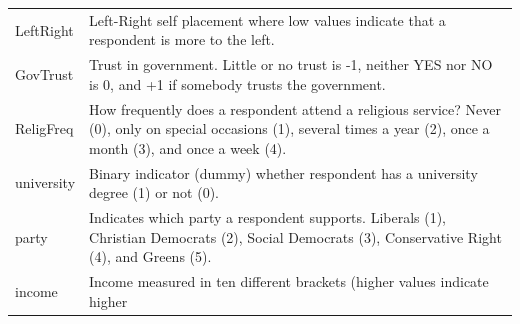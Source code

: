 \documentclass[]{article}
\theoremstyle{definition}
\theoremstyle{definition}
\theoremstyle{definition}
\theoremstyle{remark}
\begin{document}
\begin{longtable}[]{@{}ll@{}}
\begin{minipage}[t]{0.11\columnwidth}\raggedright\strut
LeftRight\strut
\end{minipage} & \begin{minipage}[t]{0.83\columnwidth}\raggedright\strut
Left-Right self placement where low values indicate that a respondent is
more to the left.\strut
\end{minipage}\tabularnewline
\begin{minipage}[t]{0.11\columnwidth}\raggedright\strut
GovTrust\strut
\end{minipage} & \begin{minipage}[t]{0.83\columnwidth}\raggedright\strut
Trust in government. Little or no trust is -1, neither YES nor NO is 0,
and +1 if somebody trusts the government.\strut
\end{minipage}\tabularnewline
\begin{minipage}[t]{0.11\columnwidth}\raggedright\strut
ReligFreq\strut
\end{minipage} & \begin{minipage}[t]{0.83\columnwidth}\raggedright\strut
How frequently does a respondent attend a religious service? Never (0),
only on special occasions (1), several times a year (2), once a month
(3), and once a week (4).\strut
\end{minipage}\tabularnewline
\begin{minipage}[t]{0.11\columnwidth}\raggedright\strut
university\strut
\end{minipage} & \begin{minipage}[t]{0.83\columnwidth}\raggedright\strut
Binary indicator (dummy) whether respondent has a university degree (1)
or not (0).\strut
\end{minipage}\tabularnewline
\begin{minipage}[t]{0.11\columnwidth}\raggedright\strut
party\strut
\end{minipage} & \begin{minipage}[t]{0.83\columnwidth}\raggedright\strut
Indicates which party a respondent supports. Liberals (1), Christian
Democrats (2), Social Democrats (3), Conservative Right (4), and Greens
(5).\strut
\end{minipage}\tabularnewline
\begin{minipage}[t]{0.11\columnwidth}\raggedright\strut
income\strut
\end{minipage} & \begin{minipage}[t]{0.83\columnwidth}\raggedright\strut
Income measured in ten different brackets (higher values indicate higher

\end{minipage}
\end{longtable}
\end{document}
